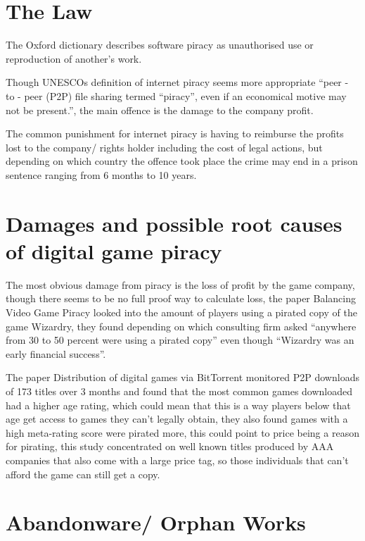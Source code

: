 \documentclass{scrartcl}
\begin{document}
\section*{The Law}

The Oxford dictionary describes software piracy as unauthorised use or reproduction of another's work.\cite{dictionary2007oxford}

Though UNESCOs definition of internet piracy seems more appropriate ``peer - to - peer (P2P) file sharing termed ``piracy'', even if an economical motive may not be present.'', the main offence is the damage to the company profit.

The common punishment for internet piracy is having to reimburse the profits lost to the company/ rights holder including the cost of legal actions, but depending on which country the offence took place the crime may end in a prison sentence ranging from 6 months to 10 years.\cite{panethiere2005persistence}

\section*{Damages and possible root causes of digital game piracy}

The most obvious damage from piracy is the loss of profit by the game company, though there seems to be no full proof way to calculate loss, the paper Balancing Video Game Piracy\cite{gorder2004balancing} looked into the amount of players using a pirated copy of the game Wizardry\cite{sir-tech1981wizardry}, they found depending on which consulting firm asked ``anywhere from 30 to 50 percent were using a pirated copy'' even though ``Wizardry was an early financial success''.

The paper Distribution of digital games via BitTorrent\cite{drachen2011distribution} monitored P2P downloads of 173 titles over 3 months and found that the most common games downloaded had a higher age rating, which could mean that this is a way players below that age get access to games they can't legally obtain, they also found games with a high meta-rating score were pirated more, this could point to price being a reason for pirating, this study concentrated on well known titles produced by AAA companies that also come with a large price tag, so those individuals that can't afford the game can still get a copy.

\section*{Abandonware/ Orphan Works}
\end{document}
